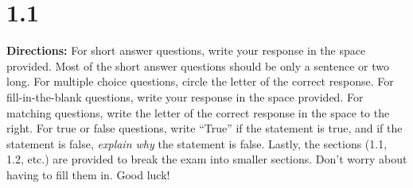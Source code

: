 \section*{1.1 \squigglyline}

\textbf{Directions:} For short answer questions, write your response in the space provided. Most of the short answer questions should be only a sentence or two long. For multiple choice questions, circle the letter of the correct response. For fill-in-the-blank questions, write your response in the space provided. For matching questions, write the letter of the correct response in the space to the right. For true or false questions, write ``True'' if the statement is true, and if the statement is false, \textit{explain why} the statement is false. Lastly, the sections (1.1, 1.2, etc.) are provided to break the exam into smaller sections. Don't worry about having to fill them in. Good luck!

